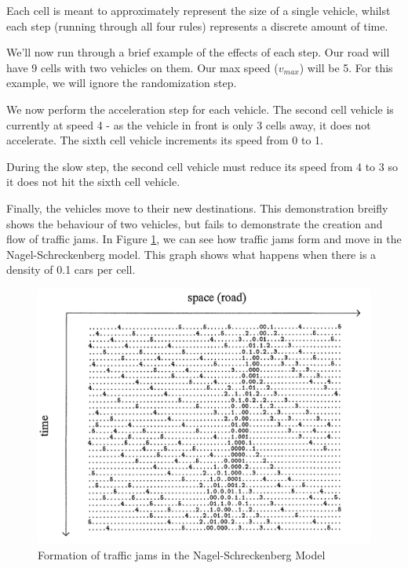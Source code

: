 \documentclass[ %
                    author={Alexander Hill},
                supervisor={Dr. Benjamin Sach},
                    degree={MEng},
                     title={MARMOSET},
                  subtitle={Multi-Agent Route Management using Online Simulation for Efficient Transportation},
                      type={research},
                      year={2016} ]{dissertation}
\begin{document}
Each cell is meant to approximately represent the size of a single vehicle,
whilst each step (running through all four rules) represents a discrete amount
of time.

We'll now run through a brief example of the effects of each step. Our road will
have 9 cells with two vehicles on them. Our max speed ($v_{max}$) will be 5.
For this example, we will ignore the randomization step.

\begin{figure}[!h]
\centering
{}
\end{figure}

We now perform the acceleration step for each vehicle. The second cell vehicle
is currently at speed 4 - as the vehicle in front is only 3 cells away, it does
not accelerate. The sixth cell vehicle increments its speed from 0 to 1.

During the slow step, the second cell vehicle must reduce its speed from 4 to 3
so it does not hit the sixth cell vehicle.

\begin{figure}[!h]
\centering
{}
\end{figure}

Finally, the vehicles move to their new destinations. This demonstration breifly
shows the behaviour of two vehicles, but fails to demonstrate the creation and
flow of traffic jams. In Figure \ref{nagel-demo}, we can see how traffic jams
form and move in the Nagel-Schreckenberg model. This graph shows what happens
when there is a density of 0.1 cars per cell.

\begin{figure}[h]
    \centering
    \includegraphics[scale=0.4]{nagel}
    \caption{Formation of traffic jams in the Nagel-Schreckenberg Model}\label{nagel-demo}
\end{figure}
\end{document}
